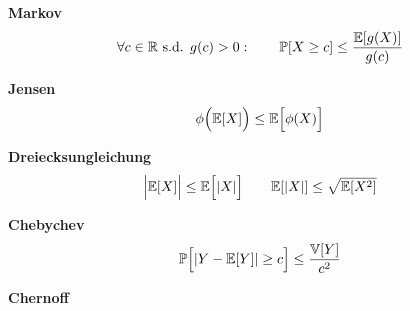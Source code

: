 \theorem \textbf{Markov}\\
\smalltext{$X \geq 0,\quad g: X(\Omega)\to[0,\infty)$ wachsend}
$$
    \forall c \in \mathbb{R} \text{ s.d. } g(c)>0:\qquad \mathbb{P}[X \geq c] \leq \frac{\mathbb{E}[g(X)]}{g(c)}
$$

\theorem \textbf{Jensen}\\
$$
    \phi\Bigl(\mathbb{E}[X]\Bigr)\leq\mathbb{E}\Bigl[\phi(X)\Bigr]
$$

\lemma \textbf{Dreiecksungleichung}\\
$$
    \Bigl\vert\mathbb{E}[X]\Bigr\vert\leq\mathbb{E}\Bigl[\vert X\vert\Bigr] \qquad \mathbb{E}[|X|] \leq \sqrt{\mathbb{E}[X^2]}
$$

\theorem \textbf{Chebychev}\\
$$
    \mathbb{P}\Bigl[ |Y-\mathbb{E}[Y]| \geq c \Bigr] \leq \frac{\mathbb{V}[Y]}{c^2}
$$

\theorem \textbf{Chernoff}
